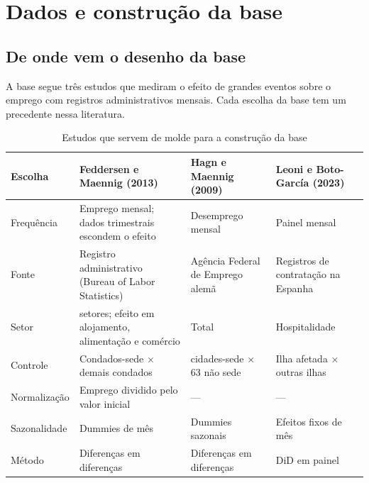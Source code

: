 \chapter{Dados e construção da base}\label{cap:dados}

\noindent{}

\section{De onde vem o desenho da base}

A base segue três estudos que mediram o efeito de grandes eventos sobre o emprego com registros
administrativos mensais. Cada escolha da base tem um precedente nessa literatura.

\begin{table}[H]
\centering\footnotesize
\caption{Estudos que servem de molde para a construção da base}\label{tab:molde}
\begin{tabularx}{\linewidth}{>{\raggedright\arraybackslash}p{2.6cm}>{\raggedright\arraybackslash}X>{\raggedright\arraybackslash}X>{\raggedright\arraybackslash}X}
\toprule
\textbf{Escolha} & \textbf{Feddersen e Maennig (2013)} & \textbf{Hagn e Maennig (2009)} & \textbf{Leoni e Boto-García (2023)}\\
\midrule
Frequência & Emprego mensal; dados trimestrais escondem o efeito & Desemprego mensal & Painel mensal\\
Fonte & Registro administrativo (Bureau of Labor Statistics) & Agência Federal de Emprego alemã & Registros de contratação na Espanha\\
Setor & 16 setores; efeito em alojamento, alimentação e comércio & Total & Hospitalidade\\
Controle & Condados-sede $\times$ demais condados & 12 cidades-sede $\times$ 63 não sede & Ilha afetada $\times$ outras ilhas\\
Normalização & Emprego dividido pelo valor inicial & --- & ---\\
Sazonalidade & Dummies de mês & Dummies sazonais & Efeitos fixos de mês\\
Método & Diferenças em diferenças & Diferenças em diferenças & DiD em painel\\
\bottomrule
\end{tabularx}
\end{table}

